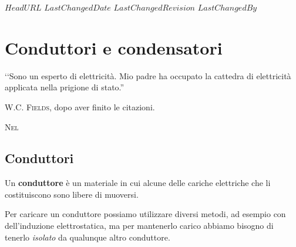 \svnidlong
{$HeadURL$}
{$LastChangedDate$}
{$LastChangedRevision$}
{$LastChangedBy$}

\chapter{Conduttori e condensatori}

\begin{introduction}
	‘‘Sono un esperto di elettricità. Mio padre ha occupato la cattedra di elettricità applicata nella	prigione di stato.''
	\begin{flushright}
		\textsc{W.C. Fields}, dopo aver finito le citazioni. %
	\end{flushright}
\end{introduction}
\lettrine[findent=1pt, nindent=0pt]{N}{el} %

\section{Conduttori}
\begin{define}[Conduttore]
	Un \textbf{conduttore} è un materiale in cui alcune delle cariche elettriche che li costituiscono sono libere di muoversi.
\end{define}
Per caricare un conduttore possiamo utilizzare diversi metodi, ad esempio con dell'induzione elettrostatica, ma per mantenerlo carico abbiamo bisogno di tenerlo \textit{isolato} da qualunque altro conduttore.

